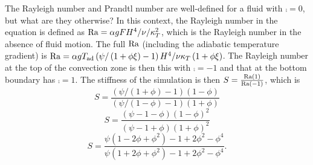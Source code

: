 	The Rayleigh number and Prandtl number are well-defined for a fluid with $\comp=0$, but what are they otherwise?
		In this context, the Rayleigh number in the equation is defined as $\mathrm{Ra}=\alpha g F H^{4}/\nu/\kappa_{T}^{2}$, which is the Rayleigh number in the absence of fluid motion.
			The full $\mathrm{Ra}$ (including the adiabatic temperature gradient) is $\mathrm{Ra}=\alpha g T_{\mathrm{ad}} \left(\psi/\left(1 + \phi\xi\right) - 1\right) H^{4}/\nu\kappa_{T}\left(1+\phi\xi\right)$.
			The Rayleigh number at the top of the convection zone is then this with $\comp=-1$ and that at the bottom boundary has $\comp=1$.
		The stiffness of the simulation is then $S=\frac{\mathrm{Ra}\left(1\right)}{\mathrm{Ra}\left(-1\right)}$, which is
		\begin{equation}
			S=\frac{\left(\psi/\left(1 + \phi\right) - 1\right)\left(1-\phi\right)}{\left(\psi/\left(1 - \phi\right) - 1\right)\left(1+\phi\right)}
		\end{equation}
		\begin{equation}
			S=\frac{\left(\psi - 1 - \phi\right)\left(1-\phi\right)^{2}}{\left(\psi - 1 + \phi\right)\left(1+\phi\right)^{2}}
		\end{equation}
		\begin{equation}
			S=\frac{\psi\left(1-2\phi+\phi^{2}\right)-1+2\phi^{2}-\phi^{4}}{\psi\left(1+2\phi+\phi^{2}\right)-1+2\phi^{2}-\phi^{4}}.
		\end{equation}




